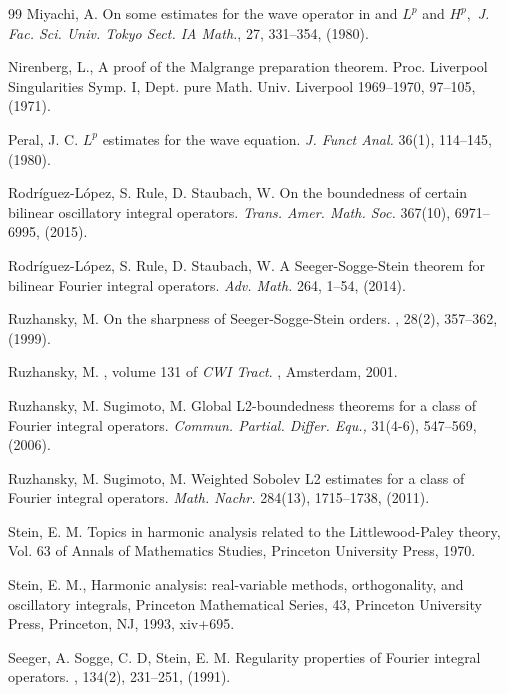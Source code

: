 \documentclass[12pt, reqno]{amsart}
\theoremstyle{definition}
\theoremstyle{remark}
\numberwithin{equation}{section}
\begin{document}
\begin{thebibliography}{99}
  Miyachi, A.
On some estimates for the wave operator in
and $L^p$ and $H^p,$
{\it J. Fac. Sci. Univ. Tokyo Sect. IA Math.}, 27, 331--354, (1980).

 Nirenberg, L., A proof of the Malgrange preparation theorem. Proc. Liverpool Singularities Symp. I, Dept. pure Math. Univ. Liverpool 1969--1970, 97--105, (1971).

  Peral, J. C. $L^p$ estimates for the wave equation. {\it J. Funct Anal.} 36(1), 114--145, (1980).

 Rodríguez-López, S. Rule, D. Staubach, W. On the boundedness of certain bilinear oscillatory integral operators. {\it Trans. Amer. Math. Soc.} 367(10), 6971--6995, (2015).

  Rodríguez-López, S. Rule, D. Staubach, W. A Seeger-Sogge-Stein theorem for bilinear Fourier integral operators. {\it Adv. Math.} 264, 1--54, (2014). 


Ruzhansky, M.
\newblock On the sharpness of Seeger-Sogge-Stein orders. 
, 28(2), 357--362, (1999).

Ruzhansky, M.
, volume 131 of {\em CWI
  Tract}.
,
  Amsterdam, 2001.

 Ruzhansky, M. Sugimoto, M. Global L2-boundedness theorems for a class of Fourier integral operators. {\it Commun. Partial. Differ. Equ.,} 31(4-6), 547--569, (2006).

 Ruzhansky, M. Sugimoto, M. Weighted Sobolev L2 estimates for a class of Fourier integral operators. {\it Math. Nachr.} 284(13), 1715--1738, (2011).

  Stein, E. M. Topics in harmonic analysis related to the Littlewood-Paley theory, Vol. 63 of Annals of Mathematics Studies, Princeton University Press, 1970.

 {Stein, E. M.},
    {Harmonic analysis: real-variable methods, orthogonality, and
              oscillatory integrals},
     {Princeton Mathematical Series},
    {43},
  {Princeton University Press, Princeton, NJ},
    {1993},
      {xiv+695}.

Seeger, A.  Sogge, C. D,  Stein, E. M.
\newblock Regularity properties of {F}ourier integral operators.
, 134(2), 231--251, (1991).


\end{thebibliography}
\end{document}
